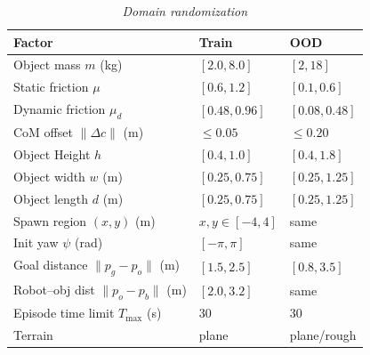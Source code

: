 
\begin{table}[t]
\centering
\caption{\textit{Domain randomization}}
\label{tab:domain_rand}
\renewcommand{\arraystretch}{1.05}
\setlength{\tabcolsep}{4pt}
\small
\begin{tabular}{@{}p{4.05cm}p{2.05cm}p{2.05cm}@{}}
\toprule
\textbf{Factor} & \textbf{Train}  & \textbf{OOD} \\
\midrule
Object mass $m$ (kg) & $[2.0,8.0]$  & $[2,18]$ \\
Static friction $\mu$ & $[0.6,1.2]$  & $[0.1,0.6]$ \\
Dynamic friction $\mu_d$ & $[0.48, 0.96]$ & $[0.08, 0.48]$ \\
CoM offset $\|\Delta c\|$ (m) & $\le 0.05$ & $\le 0.20$ \\
\midrule
Object Height $h$ & $[0.4,1.0]$  & $[0.4,1.8]$ \\
Object width $w$ (m) & $[0.25, 0.75]$ & $[0.25, 1.25]$ \\
Object length $d$ (m) & $[0.25, 0.75]$ & $[0.25, 1.25]$ \\
\midrule
Spawn region $(x,y)$ (m) & $x,y \in [-4,4]$ & same \\
Init yaw $\psi$ (rad) & $[-\pi,\pi]$ & same \\
\midrule
Goal distance $\|p_g-p_o\|$ (m) & $[1.5,2.5]$  & $[0.8,3.5]$ \\
Robot--obj dist $\|p_o-p_b\|$ (m) & $[2.0,3.2]$  & same \\
Episode time limit $T_{\max}$ (s) & 30 & 30 \\
\midrule
Terrain & plane & plane/rough \\
\bottomrule
\end{tabular}
\end{table}

